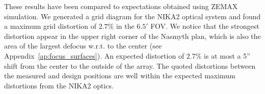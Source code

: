 These results have been compared to expectations obtained using ZEMAX
simulation. 
%
%
%
%
We generated a grid diagram for the NIKA2 optical system and found a maximum
grid distortion of $2.7\%$ in the $6.5'$ FOV. We notice that the
strongest distortion appear in the upper right corner of the Nasmyth plan, which is
also the area of the largest defocus w.r.t. to the center (see Appendix~\ref{ap:focus_surfaces}).
An expected distortion of $2.7\%$ is at most a 5'' shift from the
center to the outside of the array. The quoted distortions between the
measured and design positions are well within the expected
maximum distortions from the NIKA2 optics.



